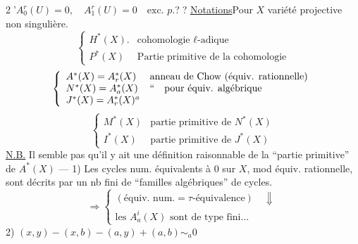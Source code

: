 {}

\textcircled{2'}\quad \(A_0^r(U)=0,\quad A_1^r(U)=0\quad\text{exc. }p.\)\quad\textcircled{??}
\uline{Notations}\quad Pour \(X\) variété projective non singulière.
\[
\left\{\begin{array}{ll}
H^*(X).&\text{cohomologie }\ell\text{-adique}\\
P^*(X)&\text{Partie primitive de la cohomologie}
\end{array}\right.
\]
\[
\left\{\begin{array}{ll}
A^*(X)=A_r^*(X)&\text{anneau de Chow (équiv. rationnelle)}\\
N^*(X)=A_a^*(X)&\text{``\quad pour équiv. algébrique}\\
J^*(X)=A_r^*(X)^a&
\end{array}\right.
\]
\[
\left\{\begin{array}{ll}
M^*(X)&\text{partie primitive de }N^*(X)\\
I^*(X)&\text{partie primitive de }J^*(X)
\end{array}\right.
\]
\uline{N.B.} Il  semble pas qu'il y ait une définition raisonnable de la ``partie primitive'' de \(A^*(X)\) \(\text{---}\)
1) Les cycles num. équivalents à 0 sur $X$, mod équiv. rationnelle, sont décrits par un nb fini de ``familles algébriques'' de cycles.
\[
\Longrightarrow\left\{
\begin{array}{l}
(\text{équiv. num.}=\tau\text{-équivalence})\quad\Downarrow\\
\text{les }A_a^i(X)\text{ sont de type fini}\ldots
\end{array}\right.
\]
2) $(x,y)-(x,b)-(a,y)+(a,b)\sim_a0$

